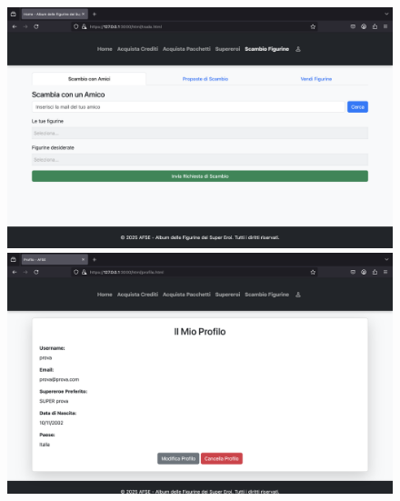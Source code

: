\documentclass{article}
\begin{document}
\begin{figure}[H]
        \vspace{0.3cm} %

        \begin{minipage}{0.3\linewidth}
            \centering
            \includegraphics[width=\linewidth]{./content/scambio.png}
        \end{minipage}
        \hfill
        \begin{minipage}{0.3\linewidth}
            \centering
            \includegraphics[width=\linewidth]{./content/profilo.png}
        \end{minipage}

    \end{figure}
\end{document}
